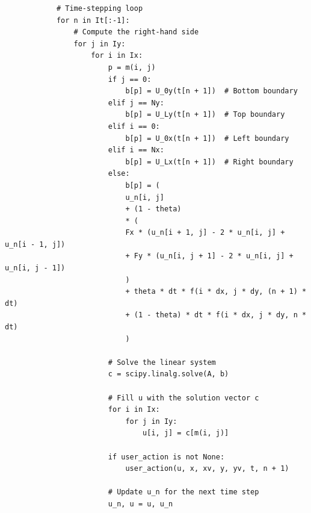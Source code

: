 \documentclass{article}
\begin{document}
		\begin{lstlisting}
			# Time-stepping loop
			for n in It[:-1]:
				# Compute the right-hand side
				for j in Iy:
					for i in Ix:
						p = m(i, j)
						if j == 0:
							b[p] = U_0y(t[n + 1])  # Bottom boundary
						elif j == Ny:
							b[p] = U_Ly(t[n + 1])  # Top boundary
						elif i == 0:
							b[p] = U_0x(t[n + 1])  # Left boundary
						elif i == Nx:
							b[p] = U_Lx(t[n + 1])  # Right boundary
						else:
							b[p] = (
							u_n[i, j]
							+ (1 - theta)
							* (
							Fx * (u_n[i + 1, j] - 2 * u_n[i, j] + u_n[i - 1, j])
							+ Fy * (u_n[i, j + 1] - 2 * u_n[i, j] + u_n[i, j - 1])
							)
							+ theta * dt * f(i * dx, j * dy, (n + 1) * dt)
							+ (1 - theta) * dt * f(i * dx, j * dy, n * dt)
							)
							
						# Solve the linear system
						c = scipy.linalg.solve(A, b)
						
						# Fill u with the solution vector c
						for i in Ix:
							for j in Iy:
								u[i, j] = c[m(i, j)]
						
						if user_action is not None:
							user_action(u, x, xv, y, yv, t, n + 1)
						
						# Update u_n for the next time step
						u_n, u = u, u_n
		\end{lstlisting}
		
\end{document}
